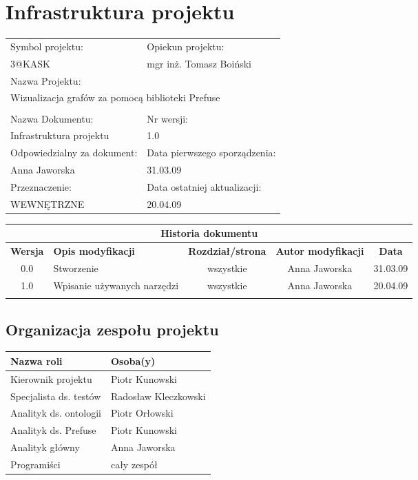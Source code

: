 







\section{Infrastruktura projektu}



\begin{center}
\begin{tabular}{|p{7cm}|p{7cm}|}
\hline
Symbol projektu: & Opiekun projektu:   \tabularnewline 
3@KASK & mgr inż. Tomasz Boiński    \tabularnewline \hline
\multicolumn{2}{|l|}{Nazwa Projektu: } \tabularnewline
\multicolumn{2}{|l|}{Wizualizacja grafów za pomocą biblioteki Prefuse } \tabularnewline 
\hline
\multicolumn{2}{l}{ } \tabularnewline %
\hline 
Nazwa Dokumentu: & Nr wersji:   \tabularnewline 
Infrastruktura projektu & 1.0 \tabularnewline \hline
Odpowiedzialny za dokument: & Data pierwszego sporządzenia:   \tabularnewline 
Anna Jaworska  & 31.03.09 \tabularnewline \hline
Przeznaczenie: & Data ostatniej aktualizacji:   \tabularnewline 
WEWNĘTRZNE & 20.04.09 \tabularnewline \hline
\end{tabular}
\end{center}

\begin{center}
\begin{tabular}{|c|p{4cm}|c|c|c|}
\multicolumn{5}{c}{\textbf{Historia dokumentu}} \tabularnewline \hline
\textbf{Wersja} & \textbf{Opis modyfikacji} & \textbf{Rozdział/strona} & \textbf{Autor modyfikacji} & \textbf{Data} \tabularnewline \hline 
0.0 & Stworzenie & wszystkie & Anna Jaworska & 31.03.09 \tabularnewline \hline
1.0 & Wpisanie używanych narzędzi & wszystkie & Anna Jaworska & 20.04.09 \tabularnewline \hline
& & & &\tabularnewline \hline
\end{tabular}
 

\end{center}





\subsection{Organizacja zespołu projektu}
\begin{center}
\begin{tabular}{|l|l|} \hline
	Nazwa roli & Osoba(y) \tabularnewline \hline
	Kierownik projektu & Piotr Kunowski \tabularnewline \hline
	Specjalista ds. testów & Radosław Kleczkowski \tabularnewline \hline
	Analityk ds. ontologii & Piotr Orłowski \tabularnewline \hline
	Analityk ds. Prefuse & Piotr Kunowski \tabularnewline \hline
	Analityk główny & Anna Jaworska \tabularnewline \hline
	Programiści & cały zespół \tabularnewline \hline
\end{tabular}
\end{center}

